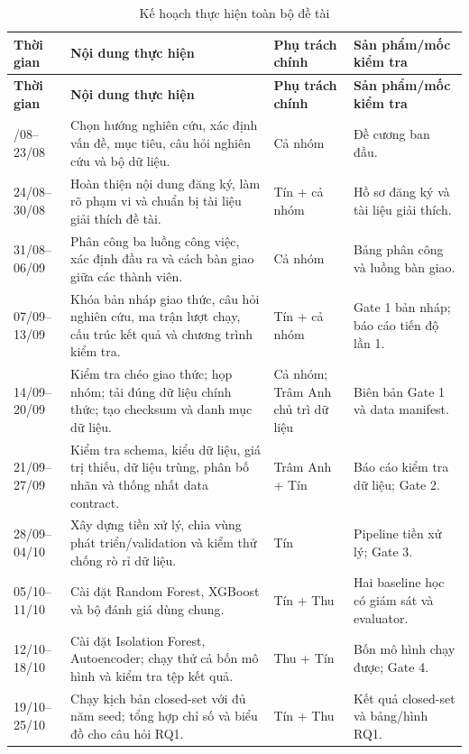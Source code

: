\documentclass[12pt,a4paper,oneside]{article}
\begin{document}
\small
\renewcommand{\arraystretch}{1.25}
\setlength{\tabcolsep}{4.5pt}
\noindent\begin{longtable}{L{2.45cm}L{5.65cm}L{2.75cm}L{4.25cm}}
\caption{Kế hoạch thực hiện toàn bộ đề tài}\label{tab:implementation-plan}\\
\toprule\textbf{Thời gian} & \textbf{Nội dung thực hiện} & \textbf{Phụ trách chính} & \textbf{Sản phẩm/mốc kiểm tra}\\
\midrule\endfirsthead
\toprule\textbf{Thời gian} & \textbf{Nội dung thực hiện} & \textbf{Phụ trách chính} & \textbf{Sản phẩm/mốc kiểm tra}\\
\midrule\endhead\bottomrule{}/08--23/08 & Chọn hướng nghiên cứu, xác định vấn đề, mục tiêu, câu hỏi nghiên cứu và bộ dữ liệu. & Cả nhóm & Đề cương ban đầu.\\
24/08--30/08 & Hoàn thiện nội dung đăng ký, làm rõ phạm vi và chuẩn bị tài liệu giải thích đề tài. & Tín + cả nhóm & Hồ sơ đăng ký và tài liệu giải thích.\\
31/08--06/09 & Phân công ba luồng công việc, xác định đầu ra và cách bàn giao giữa các thành viên. & Cả nhóm & Bảng phân công và luồng bàn giao.\\
07/09--13/09 & Khóa bản nháp giao thức, câu hỏi nghiên cứu, ma trận lượt chạy, cấu trúc kết quả và chương trình kiểm tra. & Tín + cả nhóm & Gate 1 bản nháp; báo cáo tiến độ lần 1.\\
14/09--20/09 & Kiểm tra chéo giao thức; họp nhóm; tải đúng dữ liệu chính thức; tạo checksum và danh mục dữ liệu. & Cả nhóm; Trâm Anh chủ trì dữ liệu & Biên bản Gate 1 và data manifest.\\
21/09--27/09 & Kiểm tra schema, kiểu dữ liệu, giá trị thiếu, dữ liệu trùng, phân bố nhãn và thống nhất data contract. & Trâm Anh + Tín & Báo cáo kiểm tra dữ liệu; Gate 2.\\
28/09--04/10 & Xây dựng tiền xử lý, chia vùng phát triển/validation và kiểm thử chống rò rỉ dữ liệu. & Tín & Pipeline tiền xử lý; Gate 3.\\
05/10--11/10 & Cài đặt Random Forest, XGBoost và bộ đánh giá dùng chung. & Tín + Thu & Hai baseline học có giám sát và evaluator.\\
12/10--18/10 & Cài đặt Isolation Forest, Autoencoder; chạy thử cả bốn mô hình và kiểm tra tệp kết quả. & Thu + Tín & Bốn mô hình chạy được; Gate 4.\\
19/10--25/10 & Chạy kịch bản closed-set với đủ năm seed; tổng hợp chỉ số và biểu đồ cho câu hỏi RQ1. & Tín + Thu & Kết quả closed-set và bảng/hình RQ1.\\

\end{longtable}
\end{document}
